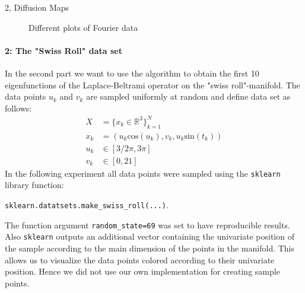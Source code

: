 \begin{task}{2, Diffusion Maps}
\begin{figure}[H]
\centering
{}
\caption{Different plots of Fourier data}
\label{fig:t2_1-dmapDifferent}
\end{figure}

\paragraph{2: The "Swiss Roll" data set}
In the second part we want to use the algorithm to obtain the first 10 eigenfunctions of the Laplace-Beltrami operator on the "swiss roll"-manifold. The data points $u_k$ and $v_k$ are sampled uniformly at random and define data set as follows:
\begin{align*}
    X &= \{ x_k\in\mathbb{R}^3\}^N_{k=1}\\
    x_k &= (u_k\text{cos}(u_k), v_k, u_k\text{sin}(t_k))\\
    u_k &\in \left[ 3/2\pi ,3\pi\right]\\
    v_k &\in \left[ 0, 21\right]
\end{align*}
In the following experiment all data points were sampled using the \verb|sklearn| library function:
\begin{center}
    \verb|sklearn.datatsets.make_swiss_roll(...)|.    
\end{center}
The function argument \verb|random_state=69| was set to have reproducible results. Also \verb|sklearn| outputs an additional vector containing the univariate position of the sample according to the main dimension of the points in the manifold. This allows us to visualize the data points colored according to their univariate position. Hence we did not use our own implementation for creating sample points.


\end{task}
